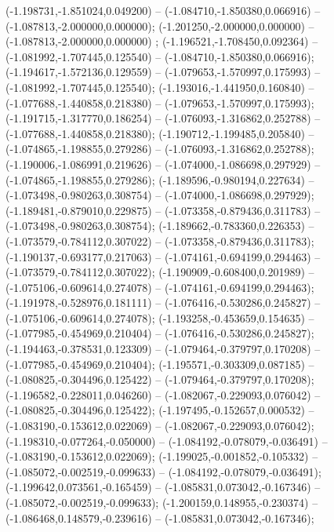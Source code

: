  (-1.198731,-1.851024,0.049200) -- (-1.084710,-1.850380,0.066916) -- (-1.087813,-2.000000,0.000000);
 (-1.201250,-2.000000,0.000000) -- (-1.087813,-2.000000,0.000000) ;
 (-1.196521,-1.708450,0.092364) -- (-1.081992,-1.707445,0.125540) -- (-1.084710,-1.850380,0.066916);
 (-1.194617,-1.572136,0.129559) -- (-1.079653,-1.570997,0.175993) -- (-1.081992,-1.707445,0.125540);
 (-1.193016,-1.441950,0.160840) -- (-1.077688,-1.440858,0.218380) -- (-1.079653,-1.570997,0.175993);
 (-1.191715,-1.317770,0.186254) -- (-1.076093,-1.316862,0.252788) -- (-1.077688,-1.440858,0.218380);
 (-1.190712,-1.199485,0.205840) -- (-1.074865,-1.198855,0.279286) -- (-1.076093,-1.316862,0.252788);
 (-1.190006,-1.086991,0.219626) -- (-1.074000,-1.086698,0.297929) -- (-1.074865,-1.198855,0.279286);
 (-1.189596,-0.980194,0.227634) -- (-1.073498,-0.980263,0.308754) -- (-1.074000,-1.086698,0.297929);
 (-1.189481,-0.879010,0.229875) -- (-1.073358,-0.879436,0.311783) -- (-1.073498,-0.980263,0.308754);
 (-1.189662,-0.783360,0.226353) -- (-1.073579,-0.784112,0.307022) -- (-1.073358,-0.879436,0.311783);
 (-1.190137,-0.693177,0.217063) -- (-1.074161,-0.694199,0.294463) -- (-1.073579,-0.784112,0.307022);
 (-1.190909,-0.608400,0.201989) -- (-1.075106,-0.609614,0.274078) -- (-1.074161,-0.694199,0.294463);
 (-1.191978,-0.528976,0.181111) -- (-1.076416,-0.530286,0.245827) -- (-1.075106,-0.609614,0.274078);
 (-1.193258,-0.453659,0.154635) -- (-1.077985,-0.454969,0.210404) -- (-1.076416,-0.530286,0.245827);
 (-1.194463,-0.378531,0.123309) -- (-1.079464,-0.379797,0.170208) -- (-1.077985,-0.454969,0.210404);
 (-1.195571,-0.303309,0.087185) -- (-1.080825,-0.304496,0.125422) -- (-1.079464,-0.379797,0.170208);
 (-1.196582,-0.228011,0.046260) -- (-1.082067,-0.229093,0.076042) -- (-1.080825,-0.304496,0.125422);
 (-1.197495,-0.152657,0.000532) -- (-1.083190,-0.153612,0.022069) -- (-1.082067,-0.229093,0.076042);
 (-1.198310,-0.077264,-0.050000) -- (-1.084192,-0.078079,-0.036491) -- (-1.083190,-0.153612,0.022069);
 (-1.199025,-0.001852,-0.105332) -- (-1.085072,-0.002519,-0.099633) -- (-1.084192,-0.078079,-0.036491);
 (-1.199642,0.073561,-0.165459) -- (-1.085831,0.073042,-0.167346) -- (-1.085072,-0.002519,-0.099633);
 (-1.200159,0.148955,-0.230374) -- (-1.086468,0.148579,-0.239616) -- (-1.085831,0.073042,-0.167346);
